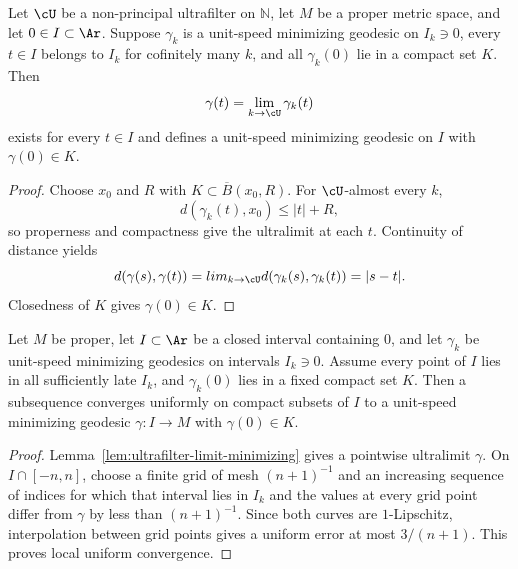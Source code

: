 \begin{lemma}
\label{lem:ultrafilter-limit-minimizing}
\leanok




Let $\cU$ be a non-principal ultrafilter on $\mathbb N$, let $M$ be a
proper metric space, and let $0\in I\subset\Ar$. Suppose $\gamma_k$ is a
unit-speed minimizing geodesic on $I_k\ni0$, every $t\in I$ belongs to
$I_k$ for cofinitely many $k$, and all $\gamma_k(0)$ lie in a compact set
$K$. Then
$$\gamma(t)=\lim_{k\to\cU}\gamma_k(t)$$
exists for every $t\in I$ and defines a unit-speed minimizing geodesic on
$I$ with $\gamma(0)\in K$.
\end{lemma}
\begin{proof}
\sketch
\leanok
{}
Choose $x_0$ and $R$ with $K\subset\overline B(x_0,R)$. For
$\cU$-almost every $k$,
$$d(\gamma_k(t),x_0)\le |t|+R,$$
so properness and compactness give the ultralimit at each $t$. Continuity
of distance yields
$$d(\gamma(s),\gamma(t))=lim_{k\to\cU}d(\gamma_k(s),\gamma_k(t))
=|s-t|.$$
Closedness of $K$ gives $\gamma(0)\in K$.
\end{proof}

\begin{lemma}
\label{lem:metric-limit-of-minimizing}
\leanok




Let $M$ be proper, let $I\subset\Ar$ be a closed interval containing
$0$, and let $\gamma_k$ be unit-speed minimizing geodesics on intervals
$I_k\ni0$. Assume every point of $I$ lies in all sufficiently late
$I_k$, and $\gamma_k(0)$ lies in a fixed compact set $K$. Then a
subsequence converges uniformly on compact subsets of $I$ to a unit-speed
minimizing geodesic $\gamma\colon I\to M$ with $\gamma(0)\in K$.
\end{lemma}
\begin{proof}
\sketch
\leanok
{}
Lemma~\ref{lem:ultrafilter-limit-minimizing} gives a pointwise ultralimit
$\gamma$. On $I\cap[-n,n]$, choose a finite grid of mesh $(n+1)^{-1}$
and an increasing sequence of indices for which that interval lies in
$I_k$ and the values at every grid point differ from $\gamma$ by less
than $(n+1)^{-1}$. Since both curves are $1$-Lipschitz, interpolation
between grid points gives a uniform error at most $3/(n+1)$. This proves
local uniform convergence.
\end{proof}

